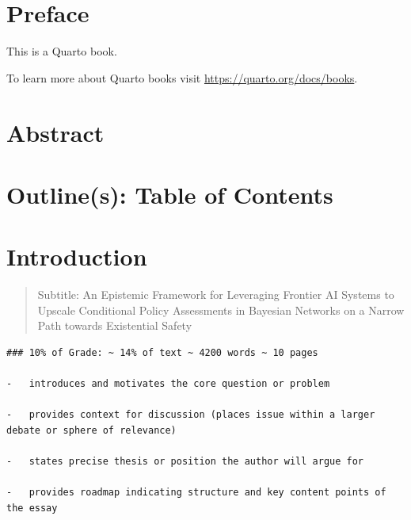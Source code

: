 \documentclass[]{book}
\begin{document}


\tableofcontents




\chapter*{Preface}\label{preface}


This is a Quarto book.

To learn more about Quarto books visit
\url{https://quarto.org/docs/books}.


\chapter*{Abstract}\label{sec-Abstract}



\chapter*{Outline(s): Table of Contents}\label{sec-ToC}



\chapter{Introduction}\label{introduction}

\begin{quote}
Subtitle: An Epistemic Framework for Leveraging Frontier AI Systems to
Upscale Conditional Policy Assessments in Bayesian Networks on a Narrow
Path towards Existential Safety
\end{quote}

\begin{verbatim}
### 10% of Grade: ~ 14% of text ~ 4200 words ~ 10 pages

-   introduces and motivates the core question or problem

-   provides context for discussion (places issue within a larger debate or sphere of relevance)

-   states precise thesis or position the author will argue for

-   provides roadmap indicating structure and key content points of the essay
\end{verbatim}
\end{document}
